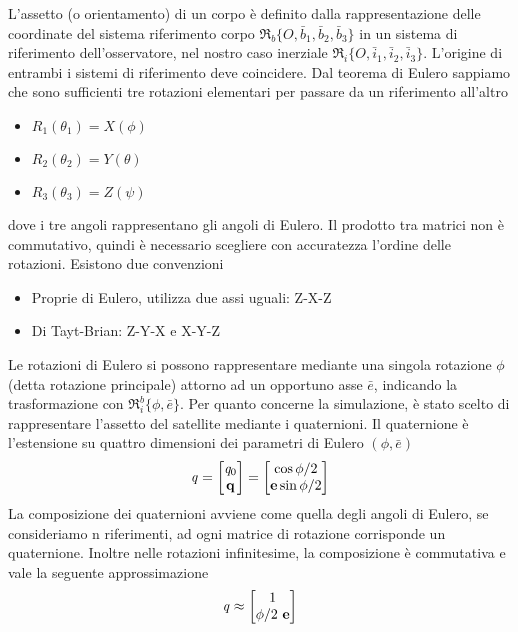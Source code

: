L'assetto (o orientamento) di un corpo è definito dalla rappresentazione delle
coordinate del sistema riferimento corpo
$\mathfrak{R}_b\{O,\bar{b}_1,\bar{b}_2,\bar{b}_3\}$ in un sistema di riferimento
dell'osservatore, nel nostro caso inerziale
$\mathfrak{R}_i\{O,\bar{i}_1,\bar{i}_2,\bar{i}_3\}$. L'origine di entrambi i
sistemi di riferimento deve coincidere. Dal teorema di Eulero sappiamo che sono
sufficienti tre rotazioni elementari per passare da un riferimento all'altro
\begin{itemize}
  \item $R_1(\theta_1)=X(\phi)$
  \item $R_2(\theta_2)=Y(\theta)$
  \item $R_3(\theta_3)=Z(\psi)$
\end{itemize}
dove i tre angoli rappresentano gli angoli di Eulero. Il prodotto tra matrici
non è commutativo, quindi è necessario scegliere con accuratezza l'ordine delle
rotazioni. Esistono due convenzioni
\begin{itemize}
  \item Proprie di Eulero, utilizza due assi uguali: Z-X-Z
  \item Di Tayt-Brian: Z-Y-X e X-Y-Z
\end{itemize}
Le rotazioni di Eulero si possono rappresentare mediante una singola rotazione
$\phi$ (detta rotazione principale) attorno ad un opportuno asse $\bar{e}$,
indicando la trasformazione con $\mathfrak{R}_i^b\{\phi,\bar{e}\}$.
Per quanto concerne la simulazione, è stato scelto di rappresentare l'assetto
del satellite mediante i quaternioni.
Il quaternione è l'estensione su quattro dimensioni dei parametri di Eulero
$(\phi,\bar{e})$
\begin{equation}
\mathit{q}=\begin{bmatrix}
\mathit{q}_0 \\ \mathit{\bf q}
\end{bmatrix} =\begin{bmatrix}
\cos{\phi/2} \\ {\bf e}\sin{\phi/2}
\end{bmatrix}
\end{equation}
La composizione dei quaternioni avviene come quella degli angoli di Eulero, se
consideriamo n riferimenti, ad ogni matrice di rotazione corrisponde un
quaternione. Inoltre nelle rotazioni infinitesime, la composizione è commutativa
e vale la seguente approssimazione
\begin{equation}
\mathit{q}\approx
\begin{bmatrix}
1\\ \phi/2 \ {\bf e}
\end{bmatrix}
\end{equation}
